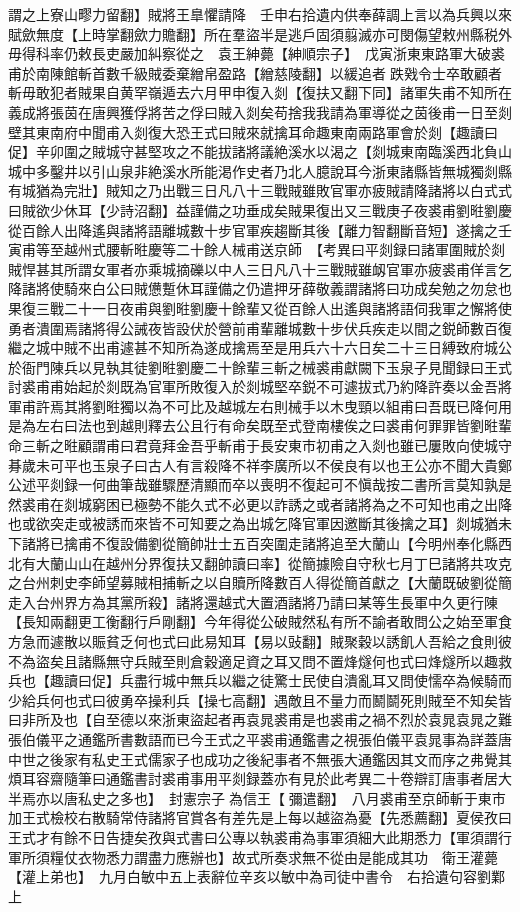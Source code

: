 謂之上寮山疁力留翻】賊將王臯懼請降　壬申右拾遺内供奉薛調上言以為兵興以來賦歛無度【上時掌翻歛力贍翻】所在羣盜半是逃戶固須翦滅亦可閔傷望敕州縣税外毋得科率仍敕長吏嚴加糾察從之　袁王紳薨【紳順宗子】　戊寅浙東東路軍大破裘甫於南陳館斬首數千級賊委棄繒帛盈路【繒慈陵翻】以緩追者跌戣令士卒敢顧者斬毋敢犯者賊果自黄罕嶺遁去六月甲申復入剡【復扶又翻下同】諸軍失甫不知所在義成將張茵在唐興獲俘將苦之俘曰賊入剡矣苟捨我我請為軍導從之茵後甫一日至剡壁其東南府中聞甫入剡復大恐王式曰賊來就擒耳命趣東南兩路軍會於剡【趣讀曰促】辛卯圍之賊城守甚堅攻之不能拔諸將議絶溪水以渴之【剡城東南臨溪西北負山城中多鑿井以引山泉非絶溪水所能渇作史者乃北人臆說耳今浙東諸縣皆無城獨剡縣有城猶為完壯】賊知之乃出戰三日凡八十三戰賊雖敗官軍亦疲賊請降諸將以白式式曰賊欲少休耳【少詩沼翻】益謹備之功垂成矣賊果復出又三戰庚子夜裘甫劉暀劉慶從百餘人出降遙與諸將語離城數十步官軍疾趨斷其後【離力智翻斷音短】遂擒之壬寅甫等至越州式腰斬暀慶等二十餘人械甫送京師　【考異曰平剡録曰諸軍圍賊於剡賊悍甚其所謂女軍者亦乘城摘礫以中人三日凡八十三戰賊雖衂官軍亦疲裘甫佯言乞降諸將使騎來白公曰賊憊蹔休耳謹備之仍遣押牙薛敬義謂諸將曰功成矣勉之勿怠也果復三戰二十一日夜甫與劉暀劉慶十餘輩又從百餘人出遙與諸將語伺我軍之懈將使勇者潰圍焉諸將得公誡夜皆設伏於營前甫輩離城數十步伏兵疾走以間之鋭師數百復繼之城中賊不出甫遽甚不知所為遂成擒焉至是用兵六十六日矣二十三日縛致府城公於衙門陳兵以見執其徒劉暀劉慶二十餘輩三斬之械裘甫獻闕下玉泉子見聞録曰王式討裘甫甫始起於剡既為官軍所敗復入於剡城堅卒鋭不可遽拔式乃約降許奏以金吾將軍甫許焉其將劉暀獨以為不可比及越城左右則械手以木曳頸以組甫曰吾既已降何用是為左右曰法也到越則釋去公且行有命矣既至式登南樓俟之曰裘甫何罪罪皆劉暀輩命三斬之暀顧謂甫曰君竟拜金吾乎斬甫于長安東市初甫之入剡也雖已屢敗向使城守朞歲未可平也玉泉子曰古人有言殺降不祥李廣所以不侯良有以也王公亦不聞大貴鄭公述平剡録一何曲筆哉雖驟歷清顯而卒以喪明不復起可不愼哉按二書所言莫知孰是然裘甫在剡城窮困已極勢不能久式不必更以詐誘之或者諸將為之不可知也甫之出降也或欲突走或被誘而來皆不可知要之為出城乞降官軍因邀斷其後擒之耳】剡城猶未下諸將已擒甫不復設備劉從簡帥壯士五百突圍走諸將追至大蘭山【今明州奉化縣西北有大蘭山山在越州分界復扶又翻帥讀曰率】從簡據險自守秋七月丁巳諸將共攻克之台州刺史李師望募賊相捕斬之以自贖所降數百人得從簡首獻之【大蘭既破劉從簡走入台州界方為其黨所殺】諸將還越式大置酒諸將乃請曰某等生長軍中久更行陳【長知兩翻更工衡翻行戶剛翻】今年得從公破賊然私有所不諭者敢問公之始至軍食方急而遽散以賑貧乏何也式曰此易知耳【易以䜴翻】賊聚穀以誘飢人吾給之食則彼不為盜矣且諸縣無守兵賊至則倉穀適足資之耳又問不置烽燧何也式曰烽燧所以趣救兵也【趣讀曰促】兵盡行城中無兵以繼之徒驚士民使自潰亂耳又問使懦卒為候騎而少給兵何也式曰彼勇卒操利兵【操七高翻】遇敵且不量力而鬭鬬死則賊至不知矣皆曰非所及也【自至德以來浙東盜起者再袁晁裘甫是也裘甫之禍不烈於袁晁袁晁之難張伯儀平之通鑑所書數語而已今王式之平裘甫通鑑書之視張伯儀平袁晁事為詳蓋唐中世之後家有私史王式儒家子也成功之後紀事者不無張大通鑑因其文而序之弗覺其煩耳容齋隨筆曰通鑑書討裘甫事用平剡録蓋亦有見於此考異二十卷辯訂唐事者居大半焉亦以唐私史之多也】　封憲宗子為信王【彌遣翻】　八月裘甫至京師斬于東市加王式檢校右散騎常侍諸將官賞各有差先是上每以越盜為憂【先悉薦翻】夏侯孜曰王式才有餘不日告捷矣孜與式書曰公專以執裘甫為事軍須細大此期悉力【軍須謂行軍所須糧仗衣物悉力謂盡力應辦也】故式所奏求無不從由是能成其功　衛王灌薨【灌上弟也】　九月白敏中五上表辭位辛亥以敏中為司徒中書令　右拾遺句容劉鄴上
